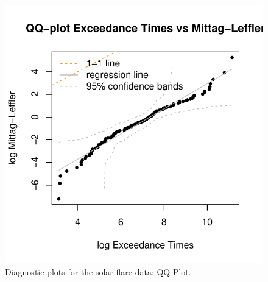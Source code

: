 \documentclass[]{elsarticle} %
\begin{document}
\begin{figure}

{\centering \includegraphics[width=0.7\linewidth]{article_springer_files/figure-latex/flare-diagnostics-3-1} 

}

\caption{\label{fig:flare-diagnostics-3} Diagnostic plots for the solar flare data: QQ Plot.}\label{fig:flare-diagnostics-3}
\end{figure}
\end{document}
